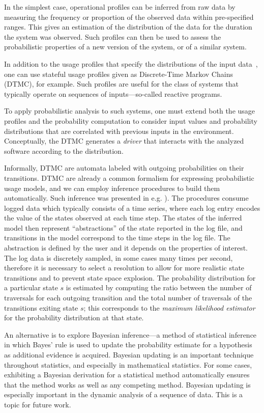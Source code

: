 In the simplest case, operational profiles can be inferred from raw
data by measuring the frequency or proportion of the observed data
within pre-specified ranges.  This gives an estimation of the
distribution of the data for the duration the system was observed.
Such profiles can then be used to assess the probabilistic properties
of a new version of the system, or of a similar system.


In addition to the usage profiles that specify the distributions of
the input data~\cite{Filieri2013}, one can use stateful usage profiles
given as Discrete-Time Markov Chains (DTMC), for example.  Such
profiles are useful for the class of systems that typically operate on
sequences of inputs---so-called reactive programs.

To apply probabilistic analysis to such systems, one must extend both
the usage profiles and the probability computation to consider input
values and probability distributions that are correlated with previous
inputs in the environment.  Conceptually, the DTMC generates a
\textit{driver} that interacts with the analyzed software according to
the distribution.

Informally, DTMC are automata labeled with outgoing probabilities on
their transitions.  DTMC are already a common formalism for expressing
probabilistic usage models, and we can employ inference procedures to
build them automatically.  Such inference was presented in
e.g. \cite{ghezzi2014mining,beschastnikh2011leveraging}). The procedures consume logged data
which typically consists of a time series, where each log entry encodes the value
of the states observed at each time step. The states of the inferred
model then represent ``abstractions'' of the state reported in the log
file, and transitions in the model correspond to the time steps in the
log file. The abstraction is defined by the user and it depends on the
properties of interest. The log data is discretely sampled, in some
cases many times per second, therefore it is necessary to select a
resolution to allow for more realistic state transitions and to
prevent state space explosion. The probability distribution for a
particular state $s$ is estimated by computing the ratio between the
number of traversals for each outgoing transition and the total number
of traversals of the transitions exiting state $s$; this corresponds
to the {\em maximum likelihood estimator} for the probability
distribution at that state.

An alternative is to explore Bayesian inference---a method of
statistical inference in which Bayes' rule is used to update the
probability estimate for a hypothesis as additional evidence is
acquired. Bayesian updating is an important technique throughout
statistics, and especially in mathematical statistics. For some cases,
exhibiting a Bayesian derivation for a statistical method
automatically ensures that the method works as well as any competing
method. Bayesian updating is especially important in the dynamic
analysis of a sequence of data. This is a topic for future work.


